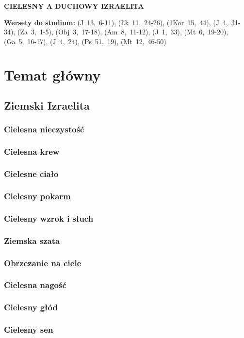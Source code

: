 \documentclass[10pt,a4paper,oneside]{article}
\begin{document}
\centerline{\textbf{\MakeUppercase{Cielesny a duchowy Izraelita}}}
\begin{center}
\textbf{Wersety do studium:} 
\mbox{(J 13, 6-11)}, \mbox{(Łk 11, 24-26)}, \mbox{(1Kor 15, 44)}, \mbox{(J 4, 31-34)}, \mbox{(Za 3, 1-5)}, \mbox{(Obj 3, 17-18)}, \mbox{(Am 8, 11-12)}, \mbox{(J 1, 33)}, \mbox{(Mt 6, 19-20)}, \mbox{(Ga 5, 16-17)}, \mbox{(J 4, 24)}, \mbox{(Ps 51, 19)}, \mbox{(Mt 12, 46-50)}
\end{center}
\section{Temat główny}
\subsection{Ziemski Izraelita}
\subsubsection{Cielesna nieczystość}
\subsubsection{Cielesna krew}
\subsubsection{Cielesne ciało}
\subsubsection{Cielesny pokarm}
\subsubsection{Cielesny wzrok i słuch}
\subsubsection{Ziemska szata}
\subsubsection{Obrzezanie na ciele}
\subsubsection{Cielesna nagość}
\subsubsection{Cielesny głód}
\subsubsection{Cielesny sen}
\end{document}

